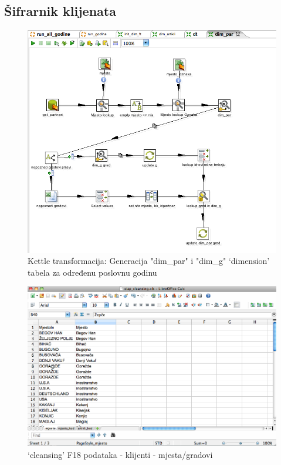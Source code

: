 \documentclass[times, utf8, seminar]{fit}
\begin{document}
\subsection{Šifrarnik klijenata}

\begin{figure}[H]
\centering
\includegraphics[width=15cm]{img/kettle_tr_dim_par.png}
\caption{Kettle transformacija: Generacija "dim\_par" i "dim\_g" `dimension' tabela za određenu poslovnu godinu}
\end{figure}


\begin{figure}[H]
\centering
\includegraphics[width=15cm]{img/clean_mjesto.png}
\caption{`cleansing' F18 podataka -  klijenti - mjesta/gradovi}
\end{figure}
\end{document}
